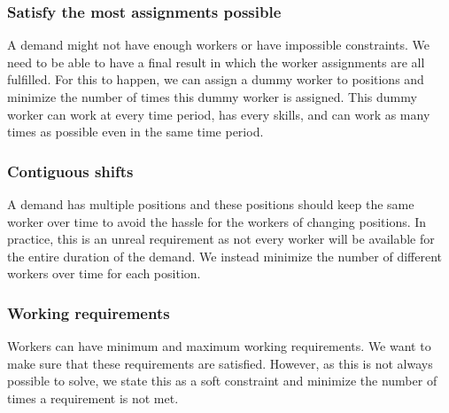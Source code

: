 \documentclass[../thesis.tex]{subfiles}
\begin{document}
\subsubsection{Satisfy the most assignments possible}

A demand might not have enough workers or have impossible constraints. We need to be able to have 
a final result in which the worker assignments are all fulfilled.
For this to happen, we can assign a dummy worker to positions and minimize the number of times this dummy worker is 
assigned. This dummy worker can work at every time period, has every skills, 
and can work as many times as possible even in the same time period.


\subsubsection{Contiguous shifts}

A demand has multiple positions and these positions should keep the same worker over time to avoid the hassle for the workers of changing positions. In practice,
this is an unreal requirement as not every worker will be available for the entire duration of the demand. 
We instead minimize the number of different workers over time for each position.

\subsubsection{Working requirements}

Workers can have minimum and maximum working requirements. We want to make sure 
that these requirements are satisfied. However, as this is not always possible to solve, we 
state this as a soft constraint and minimize the number of times a requirement is not met.
\end{document}
